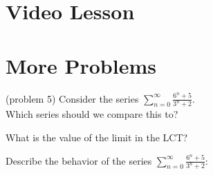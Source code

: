 \documentclass[handout]{ximera}
\begin{document}
\section{Video Lesson}

\begin{center}
\begin{foldable}
\end{foldable}
\end{center}


\section{More Problems}


\begin{problem}(problem 5)
Consider the series $\displaystyle{\sum_{n=0}^\infty \frac{6^n + 5}{3^n + 2}}$.\\
Which series should we compare this to?

\begin{multipleChoice}
\end{multipleChoice}

What is the value of the limit in the LCT?
\begin{multipleChoice}
\end{multipleChoice}

Describe the behavior of the series $\displaystyle{\sum_{n=0}^\infty \frac{6^n + 5}{3^n + 2}:}$
\begin{multipleChoice}
\end{multipleChoice}

\end{problem}
\end{document}
